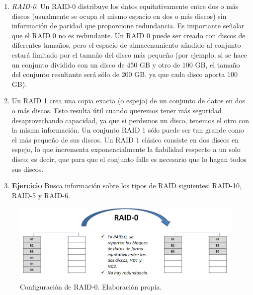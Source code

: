 \documentclass[
]{book}
\providecommand{\tightlist}{%
  \setlength{\itemsep}{0pt}\setlength{\parskip}{0pt}}
\begin{document}
\begin{enumerate}
  \begin{enumerate}
  \def\labelenumii{\alph{enumii}.}
  \tightlist
  \item
    \emph{RAID-0}. Un RAID-0 distribuye los datos equitativamente entre dos o más discos (usualmente se ocupa el mismo espacio en dos o más discos) sin información de paridad que proporcione redundancia. Es importante señalar que el RAID 0 no es redundante. Un RAID 0 puede ser creado con discos de diferentes tamaños, pero el espacio de almacenamiento añadido al conjunto estará limitado por el tamaño del disco más pequeño (por ejemplo, si se hace un conjunto dividido con un disco de 450 GB y otro de 100 GB, el tamaño del conjunto resultante será sólo de 200 GB, ya que cada disco aporta 100 GB).
  \item
    Un RAID 1 crea una copia exacta (o espejo) de un conjunto de datos en dos o más discos. Esto resulta útil cuando queremos tener más seguridad desaprovechando capacidad, ya que si perdemos un disco, tenemos el otro con la misma información. Un conjunto RAID 1 sólo puede ser tan grande como el más pequeño de sus discos. Un RAID 1 clásico consiste en dos discos en espejo, lo que incrementa exponencialmente la fiabilidad respecto a un solo disco; es decir, que para que el conjunto falle es necesario que lo hagan todos sus discos.
  \item
    \textbf{Ejercicio} Busca información sobre los tipos de RAID siguientes: RAID-10, RAID-5 y RAID-6.
  \end{enumerate}
\end{enumerate}

\begin{figure}

{\centering \includegraphics[width=0.9\linewidth]{images/raid0} 

}

\caption{Configuración de RAID-0. Elaboración propia.}\label{fig:rmarkdown}
\end{figure}
\end{document}
